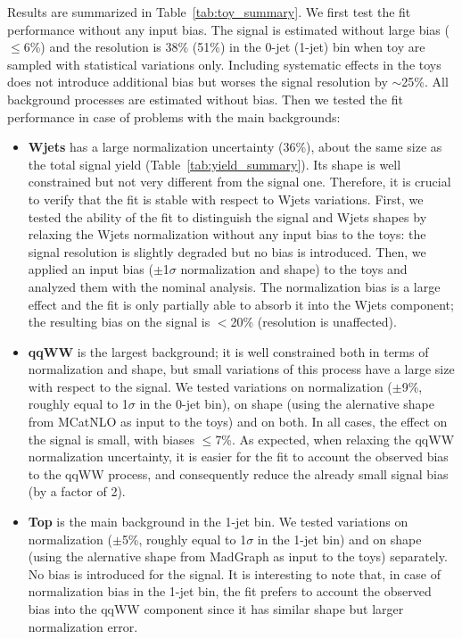 Results are summarized in Table~\ref{tab:toy_summary}.
We first test the fit performance without any input bias. 
The signal is estimated without large bias ($\leq 6$\%) and the resolution is 38\% (51\%) in the 0-jet (1-jet) bin 
when toy are sampled with statistical variations only. Including systematic effects in the toys does not introduce
additional bias but worses the signal resolution by $\sim$25\%. All background processes are estimated without bias.
Then we tested the fit performance in case of problems with the main backgrounds:
\begin{itemize}
\item {\bf Wjets} has a large normalization uncertainty (36\%), about the same size as the total signal yield (Table~\ref{tab:yield_summary}). 
Its shape is well constrained but not very different from the signal one. 
Therefore, it is crucial to verify that the fit is stable with respect to Wjets variations.
First, we tested the ability of the fit to distinguish the signal and Wjets shapes by relaxing the Wjets normalization without any input 
bias to the toys: the signal resolution is slightly degraded but no bias is introduced. 
Then, we applied an input bias ($\pm$1$\sigma$ normalization and shape) to the toys and analyzed them with the nominal analysis. 
The normalization bias is a large effect and the fit is only partially able to absorb it into the Wjets component; 
the resulting bias on the signal is $<$20\% (resolution is unaffected).
\item {\bf qqWW} is the largest background; it is well constrained both in terms of normalization and shape, but small variations of this 
process have a large size with respect to the signal. 
We tested variations on normalization ($\pm$9\%, roughly equal to 1$\sigma$ in the 0-jet bin), 
on shape (using the alernative shape from MCatNLO as input to the toys) and on both. 
In all cases, the effect on the signal is small, with biases $\leq$7\%. 
As expected, when relaxing the qqWW normalization uncertainty, it is easier for the fit to account the observed bias to the qqWW process,
and consequently reduce the already small signal bias (by a factor of 2).
\item {\bf Top} is the main background in the 1-jet bin. 
We tested variations on normalization ($\pm$5\%, roughly equal to 1$\sigma$ in the 1-jet bin) and on shape 
(using the alernative shape from MadGraph as input to the toys) separately. No bias is introduced for the signal. 
It is interesting to note that, in case of normalization bias in the 1-jet bin, the fit prefers to account the observed bias 
into the qqWW component since it has similar shape but larger normalization error.
\end{itemize}

